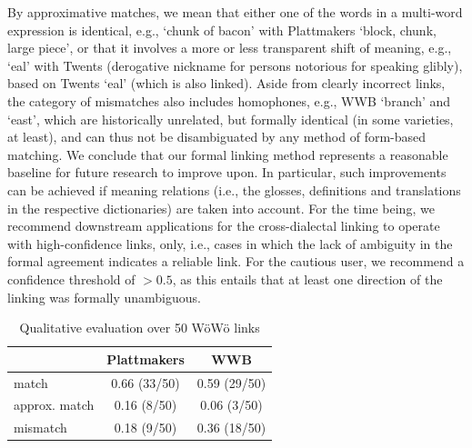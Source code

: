 By approximative matches, we mean that either one of the words in a multi-word expression is identical, e.g.,  `chunk of bacon' with Plattmakers  `block, chunk, large piece', or that it involves a more or less transparent shift of meaning, e.g.,  `eal' with Twents  (derogative nickname for persons notorious for speaking glibly), based on Twents  `eal' (which is also linked). 
Aside from clearly incorrect links, the category of mismatches also includes homophones, e.g., WWB  `branch' and  `east', which are historically unrelated, but formally identical (in some varieties, at least), and can thus not be disambiguated by any method of form-based matching.  We conclude that our formal linking method represents a reasonable baseline for future research to improve upon.
In particular, such improvements can be achieved if meaning relations (i.e., the glosses, definitions and translations in the respective dictionaries) are taken into account. 
For the time being, we recommend downstream applications for the cross-dialectal linking to operate with high-confidence links, only, i.e., cases in which the lack of ambiguity in the formal agreement indicates a reliable link. For the cautious user, we recommend a confidence threshold of $>0.5$, as this entails that at least one direction of the linking was formally unambiguous. 

\begin{table}
        \centering
        {\small 
        \begin{tabular}{lcc}
        & Plattmakers           & WWB \\\hline
        match                   & 0.66 (33/50) & 0.59 (29/50) \\
        approx. match     & 0.16 (8/50) & 0.06 (3/50) \\
        mismatch                & 0.18 (9/50) & 0.36 (18/50) \\
    \end{tabular}
    } %
    \caption{Qualitative evaluation over 50 WöWö links}
    \label{tab-eval}
\end{table}


